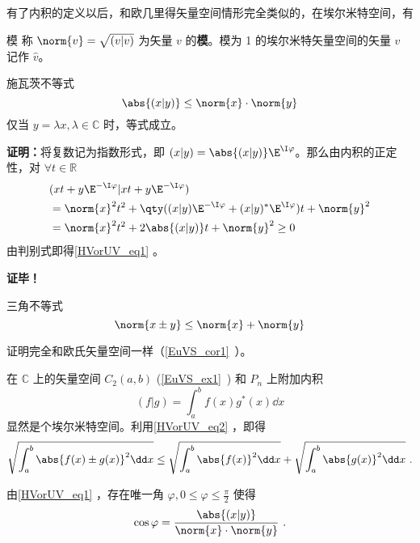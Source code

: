 有了内积的定义以后，和欧几里得矢量空间情形完全类似的，在埃尔米特空间，有
\begin{definition}{模}
称 $\norm{  v}=\sqrt{(  v|  v)}$ 为矢量 $  v$ 的\textbf{模}。模为 1 的埃尔米特矢量空间的矢量 $v$ 记作 $\hat{v}$。
\end{definition} 
\begin{theorem}{施瓦茨不等式}
\begin{equation}\label{HVorUV_eq1}
\abs{(  x|  y)}\leq \norm{  x}\cdot \norm{  y}
\end{equation}
仅当 $  y=\lambda  x,\lambda\in\mathbb{C}$ 时，等式成立。
\end{theorem}
\textbf{证明：}将复数记为指数形式，即 $(  x|  y)=\abs{(  x|  y)}\E^{\I \varphi}$。那么由内积的正定性，对 $\forall t\in\mathbb{R}$
\begin{equation}
\begin{aligned}
&(  x t+  y\E^{-\I\varphi}|  x t+  y\E^{-\I\varphi})\\
&=\norm{  x}^2t^2+\qty((  x|  y)\E^{-\I\varphi}+(  x|  y)^*\E^{\I\varphi})t+\norm{  y}^2\\
&=\norm{  x}^2t^2+2\abs{(  x|  y)}t+\norm{  y}^2\geq0
\end{aligned}
\end{equation}
由判别式即得\autoref{HVorUV_eq1} 。

\textbf{证毕！}
\begin{corollary}{三角不等式}
\begin{equation}\label{HVorUV_eq2}
\norm{  x\pm  y}\leq\norm{  x}+\norm{  y}
\end{equation}
\end{corollary}
证明完全和欧氏矢量空间一样（\autoref{EuVS_cor1}~）。
\begin{example}{}\label{HVorUV_ex1}
在 $\mathbb{C}$ 上的矢量空间 $C_2(a,b)$ (\autoref{EuVS_ex1}~) 和 $P_n$ 上附加内积
\begin{equation}
(f|g)=\int_a^{b}f(x)g^*(x)\dd x
\end{equation}
显然是个埃尔米特空间。利用\autoref{HVorUV_eq2} ，即得
\begin{equation}
\sqrt{\int_a^b\abs{f(x)\pm g(x)}^2\dd x}\leq\sqrt{\int_a^b\abs{f(x)}^2\dd x}+\sqrt{\int_a^b\abs{g(x)}^2\dd x}~.
\end{equation}
\end{example}
由\autoref{HVorUV_eq1} ，存在唯一角 $\varphi,0\leq\varphi\leq\frac{\pi}{2}$ 使得
\begin{equation}
\cos\varphi=\frac{\abs{(  x|  y)}}{\norm{  x}\cdot \norm{  y}}~.
\end{equation}
